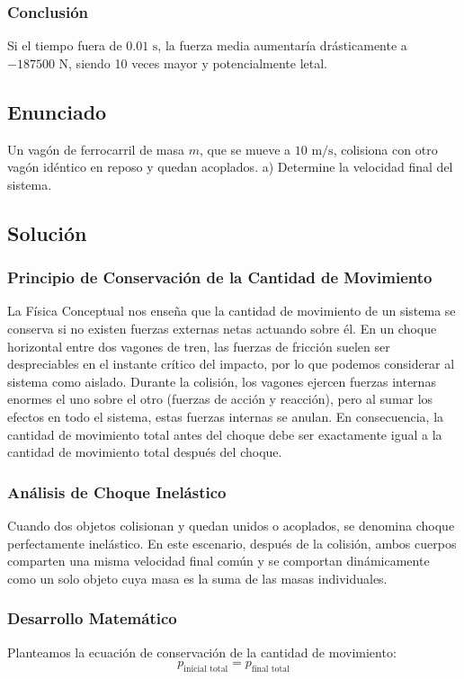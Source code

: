 \documentclass{article}
\begin{document}
\subsubsection*{Conclusión}
Si el tiempo fuera de $0.01 \text{ s}$, la fuerza media aumentaría drásticamente a $-187500 \text{ N}$, siendo 10 veces mayor y potencialmente letal.

\newpage

\subsection*{Enunciado}
Un vagón de ferrocarril de masa $m$, que se mueve a $10 \text{ m/s}$, colisiona con otro vagón idéntico en reposo y quedan acoplados. 
a) Determine la velocidad final del sistema.

\subsection*{Solución}

\subsubsection*{Principio de Conservación de la Cantidad de Movimiento}
La Física Conceptual nos enseña que la cantidad de movimiento de un sistema se conserva si no existen fuerzas externas netas actuando sobre él. En un choque horizontal entre dos vagones de tren, las fuerzas de fricción suelen ser despreciables en el instante crítico del impacto, por lo que podemos considerar al sistema como aislado. Durante la colisión, los vagones ejercen fuerzas internas enormes el uno sobre el otro (fuerzas de acción y reacción), pero al sumar los efectos en todo el sistema, estas fuerzas internas se anulan. En consecuencia, la cantidad de movimiento total antes del choque debe ser exactamente igual a la cantidad de movimiento total después del choque.

\subsubsection*{Análisis de Choque Inelástico}
Cuando dos objetos colisionan y quedan unidos o acoplados, se denomina choque perfectamente inelástico. En este escenario, después de la colisión, ambos cuerpos comparten una misma velocidad final común y se comportan dinámicamente como un solo objeto cuya masa es la suma de las masas individuales.

\subsubsection*{Desarrollo Matemático}
Planteamos la ecuación de conservación de la cantidad de movimiento:
$$p_{\text{inicial total}} = p_{\text{final total}}$$
\end{document}

